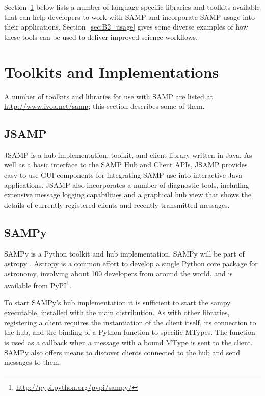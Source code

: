 Section~\ref{sec:B2_libs} below lists a number of language-specific libraries and toolkits available that can help developers to work with SAMP and incorporate SAMP usage into their applications. Section~\ref{sec:B2_usage} gives some diverse examples of how these tools can be used to deliver improved science workflows.

\section{Toolkits and Implementations}
\label{sec:B2_libs}

A number of toolkits and libraries for use with SAMP are listed at \url{http://www.ivoa.net/samp}; this section describes some of them.

\subsection{JSAMP}

JSAMP is a hub implementation, toolkit, and client library written in Java. As well as a basic interface to the SAMP Hub and Client APIs, JSAMP provides easy-to-use GUI components for integrating SAMP use into interactive Java applications. JSAMP also incorporates a number of diagnostic tools, including extensive message logging capabilities and a graphical hub view that shows the details of currently registered clients and recently transmitted messages.

\subsection{SAMPy}

SAMPy is a Python toolkit and hub implementation. SAMPy will be part of  astropy \citep{O30_adassxxii}. Astropy is a common effort to develop a single Python core package for astronomy, involving about 100 developers from around the world, and is available from PyPI\footnote{\url{http://pypi.python.org/pypi/sampy/}}.

To start SAMPy's hub implementation it is sufficient to start the sampy executable, installed with the main distribution. As with other libraries, registering a client requires the instantiation of the client itself, its connection to the hub, and the binding of a Python function to specific MTypes. The function is used as a callback when a message with a bound MType is sent to the client. SAMPy also offers means to discover clients connected to the hub and send messages to them.

